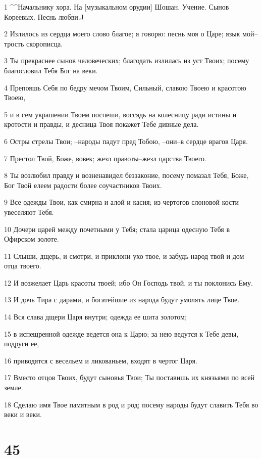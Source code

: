 \par 1 ^^Начальнику хора. На [музыкальном орудии] Шошан. Учение. Сынов Кореевых. Песнь любви.^^
\par 2 Излилось из сердца моего слово благое; я говорю: песнь моя о Царе; язык мой--трость скорописца.
\par 3 Ты прекраснее сынов человеческих; благодать излилась из уст Твоих; посему благословил Тебя Бог на веки.
\par 4 Препояшь Себя по бедру мечом Твоим, Сильный, славою Твоею и красотою Твоею,
\par 5 и в сем украшении Твоем поспеши, воссядь на колесницу ради истины и кротости и правды, и десница Твоя покажет Тебе дивные дела.
\par 6 Остры стрелы Твои; --народы падут пред Тобою, --они--в сердце врагов Царя.
\par 7 Престол Твой, Боже, вовек; жезл правоты--жезл царства Твоего.
\par 8 Ты возлюбил правду и возненавидел беззаконие, посему помазал Тебя, Боже, Бог Твой елеем радости более соучастников Твоих.
\par 9 Все одежды Твои, как смирна и алой и касия; из чертогов слоновой кости увеселяют Тебя.
\par 10 Дочери царей между почетными у Тебя; стала царица одесную Тебя в Офирском золоте.
\par 11 Слыши, дщерь, и смотри, и приклони ухо твое, и забудь народ твой и дом отца твоего.
\par 12 И возжелает Царь красоты твоей; ибо Он Господь твой, и ты поклонись Ему.
\par 13 И дочь Тира с дарами, и богатейшие из народа будут умолять лице Твое.
\par 14 Вся слава дщери Царя внутри; одежда ее шита золотом;
\par 15 в испещренной одежде ведется она к Царю; за нею ведутся к Тебе девы, подруги ее,
\par 16 приводятся с весельем и ликованьем, входят в чертог Царя.
\par 17 Вместо отцов Твоих, будут сыновья Твои; Ты поставишь их князьями по всей земле.
\par 18 Сделаю имя Твое памятным в род и род; посему народы будут славить Тебя во веки и веки.

\chapter{45}

